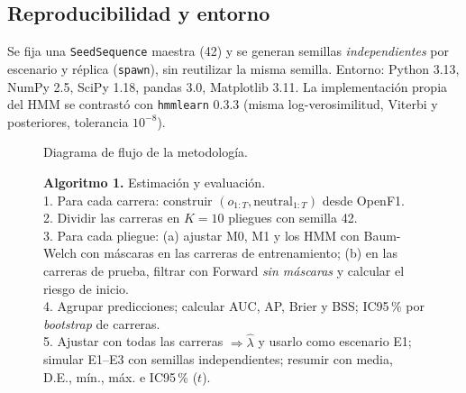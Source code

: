 \documentclass[11pt,letterpaper]{article}
\begin{document}
\subsection{Reproducibilidad y entorno}
Se fija una \texttt{SeedSequence} maestra (42) y se generan semillas \emph{independientes} por escenario y réplica (\texttt{spawn}), sin reutilizar la misma semilla. Entorno: Python 3.13, NumPy 2.5, SciPy 1.18, pandas 3.0, Matplotlib 3.11. La implementación propia del HMM se contrastó con \texttt{hmmlearn} 0.3.3 (misma log-verosimilitud, Viterbi y posteriores, tolerancia $10^{-8}$).

\begin{figure}[ht]
\centering
{}
\caption{Diagrama de flujo de la metodología.}
\end{figure}

\begin{figure}[ht]
\small
\begin{minipage}{0.95\linewidth}
\textbf{Algoritmo 1.} Estimación y evaluación.\\
1. Para cada carrera: construir $(o_{1:T},\text{neutral}_{1:T})$ desde OpenF1.\\
2. Dividir las carreras en $K=10$ pliegues con semilla 42.\\
3. Para cada pliegue: (a) ajustar M0, M1 y los HMM con Baum-Welch con máscaras en las carreras de entrenamiento; (b) en las carreras de prueba, filtrar con Forward \emph{sin máscaras} y calcular el riesgo de inicio.\\
4. Agrupar predicciones; calcular AUC, AP, Brier y BSS; IC95\,\% por \emph{bootstrap} de carreras.\\
5. Ajustar con todas las carreras $\Rightarrow\hat\lambda$ y usarlo como escenario E1; simular E1--E3 con semillas independientes; resumir con media, D.E., mín., máx. e IC95\,\% ($t$).
\end{minipage}
\end{figure}
\end{document}
